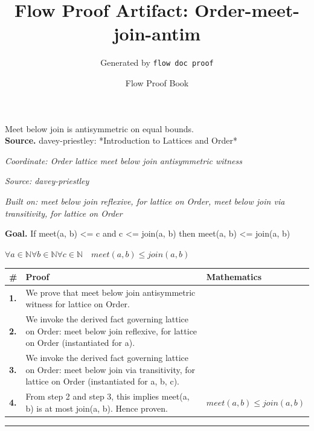 \documentclass[11pt]{article}
\title{Flow Proof Artifact: Order-meet-join-antim}
\author{Generated by \texttt{flow doc proof}}
\date{Flow Proof Book}
\theoremstyle{definition}
\begin{document}
\maketitle
Meet below join is antisymmetric on equal bounds.\\[0.5em]
\textbf{Source.} davey-priestley: *Introduction to Lattices and Order*\\[0.5em]
\bigskip
{}\par
\smallskip\noindent\textit{Coordinate: Order \cdot lattice \cdot meet below join antisymmetric witness}\par
\smallskip\noindent\textit{Source: davey-priestley}\par
\smallskip\noindent\textit{Built on: meet below join reflexive, for lattice on Order, meet below join via transitivity, for lattice on Order}\par
\medskip
\noindent\textbf{Goal.} If meet(a, b) <= c and c <= join(a, b) then meet(a, b) <= join(a, b)\par
\noindent$\displaystyle \forall a \in \mathbb{N} \forall b \in \mathbb{N} \forall c \in \mathbb{N}\quad meet(a, b) \le join(a, b)$\par
\medskip
\noindent
\begin{tabular}{@{} >{\raggedright\arraybackslash}p{} >{\raggedright\arraybackslash}p{} >{\raggedleft\arraybackslash}p{} @{}}
\textbf{\#} & \textbf{Proof} & \textbf{Mathematics} \\
\midrule
\textbf{1.} & We prove that meet below join antisymmetric witness for lattice on Order. & \\[0.45em]
\textbf{2.} & We invoke the derived fact governing lattice on Order: meet below join reflexive, for lattice on Order (instantiated for a). & \\[0.45em]
\textbf{3.} & We invoke the derived fact governing lattice on Order: meet below join via transitivity, for lattice on Order (instantiated for a, b, c). & \\[0.45em]
\textbf{4.} & From step 2 and step 3, this implies meet(a, b) is at most join(a, b). Hence proven. & $\displaystyle meet(a, b) \le join(a, b)$ \\[0.45em]
\bottomrule
\end{tabular}
\label{thm:Order-lattice-meet_below_join_antisymmetric_witness}
\par\medskip\hrule
\end{document}
